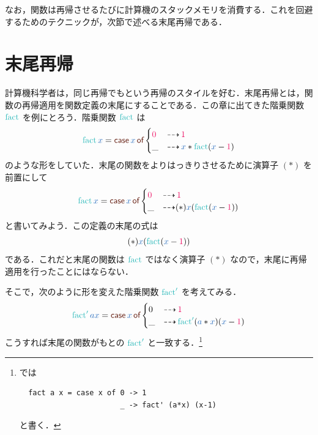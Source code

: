 \documentclass[a5paper,twoside,fleqn,draft]{jsbook}
\begin{document}
なお，関数は再帰させるたびに計算機のスタックメモリを消費する．これを回避するためのテクニックが，次節で述べる末尾再帰である．

\section{末尾再帰}

計算機科学者は，同じ再帰でもという再帰のスタイルを好む．末尾再帰とは，関数の再帰適用を関数定義の末尾にすることである．この章に出てきた階乗関数 $\mFact$ を例にとろう．階乗関数 $\mFact$ は
\begin{equation}
  \mFact\hVar{x}
  =\hCaseSyntax{\hVar{x}}\begin{cases}
    \hConstant{0}
    &\hIfSo\hConstant{1}\\
    \_
    &\hIfSo\hVar{x}*\mFact(\hVar{x}-\hConstant{1})
  \end{cases}
\end{equation}
のような形をしていた．末尾の関数をよりはっきりさせるために演算子 $(*)$ を前置にして
\begin{equation}
  \mFact\hVar{x}
  =\hCaseSyntax{\hVar{x}}
  \begin{cases}
    \hConstant{0}
    &\hIfSo\hConstant{1}\\
    \_
    &\hIfSo(*)\hVar{x}(\mFact(\hVar{x}-\hConstant{1}))
  \end{cases}
\end{equation}
と書いてみよう．この定義の末尾の式は
\begin{equation}
  (*)\hVar{x}(\mFact(\hVar{x}-\hConstant{1}))
\end{equation}
である．これだと末尾の関数は $\mFact$ ではなく演算子 $(*)$ なので，末尾に再帰適用を行ったことにはならない．

そこで，次のように形を変えた階乗関数 $\mFFact$ を考えてみる．
\begin{equation}
  \mFFact\hVar{a}\hVar{x}
  =\hCaseSyntax{\hVar{x}}
  \begin{cases}
    0
    &\hIfSo\hConstant{1}\\
    \_
    &\hIfSo\mFFact(\hVar{a}*\hVar{x})(\hVar{x}-\hConstant{1})
  \end{cases}
\end{equation}
こうすれば末尾の関数がもとの $\mFFact$ と一致する．\footnote{\haskell では
\begin{verbatim}
  fact a x = case x of 0 -> 1
                       _ -> fact' (a*x) (x-1)
\end{verbatim}
と書く．}
\end{document}

